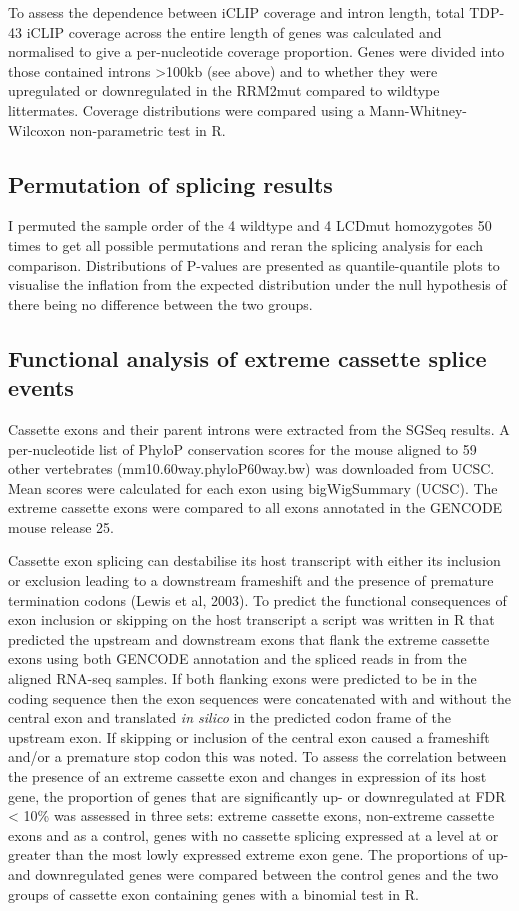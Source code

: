 To assess  the  dependence between  iCLIP  coverage and  intron  length,  total TDP-43  iCLIP  coverage  across  the entire length of genes was calculated and normalised  to give a per-nucleotide coverage proportion. 
Genes were divided into those contained introns >100kb (see above) and to whether they were  upregulated  or  downregulated in  the RRM2mut compared  to wildtype littermates.  
Coverage distributions were compared using a Mann-Whitney-Wilcoxon non-parametric test in R.

\subsection{Permutation of splicing results}
I permuted the sample order of the 4 wildtype and 4 LCDmut homozygotes 50 times to get all possible permutations and reran the splicing analysis for each comparison. 
Distributions of P-values are presented as quantile-quantile plots to visualise the inflation from the expected distribution under the null hypothesis of there being no difference between the two groups. 

\subsection{Functional analysis of extreme cassette splice events}
Cassette exons and their parent introns were extracted from the SGSeq results.
A per-nucleotide list of  PhyloP  conservation  scores \citep{Pollard2010-fj} for  the mouse  aligned  to  59  other  vertebrates (mm10.60way.phyloP60way.bw) was downloaded from UCSC. 
Mean scores were calculated for each exon  using  bigWigSummary  (UCSC). 
The  extreme  cassette  exons  were  compared  to  all  exons annotated in the GENCODE mouse release 25. 

Cassette exon splicing can destabilise its host transcript with either its inclusion or exclusion leading to a downstream frameshift and the presence of premature termination codons (Lewis et al, 2003). 
To predict the functional consequences of exon inclusion or skipping on the host transcript a script was written in R that predicted the upstream and downstream exons that  flank the extreme cassette exons using both GENCODE annotation and the spliced reads in from the aligned RNA-seq samples. 
If both flanking exons were predicted to be in the coding sequence then the exon sequences were concatenated with and without the central exon and translated \textit{in silico} in the predicted codon frame of the upstream exon. 
If skipping or inclusion of the central exon caused a frameshift and/or a premature stop codon this was noted. 
To  assess  the  correlation  between  the  presence  of  an  extreme  cassette  exon  and  changes  in expression of its host gene, the proportion of genes that are significantly up- or downregulated at FDR < 10\% was assessed in three sets:
extreme cassette exons, non-extreme cassette exons and as a control, genes with no cassette splicing expressed at a level at or greater than the most lowly expressed extreme exon gene. 
The proportions of up- and downregulated genes were compared between  the control genes and the two groups of cassette exon containing genes with a binomial test in R.   

